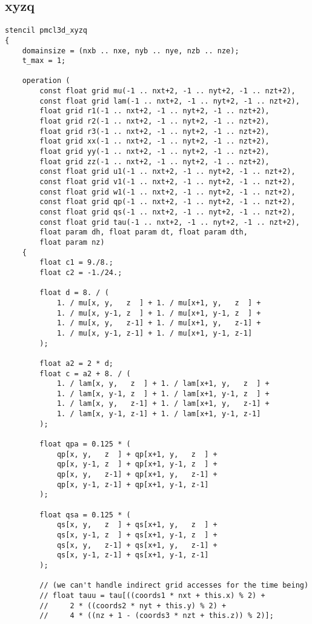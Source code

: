 \subsection{xyzq}
\begin{lstlisting}[language=stencil]
stencil pmcl3d_xyzq
{
	domainsize = (nxb .. nxe, nyb .. nye, nzb .. nze);
	t_max = 1;
	
	operation (
		const float grid mu(-1 .. nxt+2, -1 .. nyt+2, -1 .. nzt+2),
		const float grid lam(-1 .. nxt+2, -1 .. nyt+2, -1 .. nzt+2),
		float grid r1(-1 .. nxt+2, -1 .. nyt+2, -1 .. nzt+2), 
		float grid r2(-1 .. nxt+2, -1 .. nyt+2, -1 .. nzt+2),
		float grid r3(-1 .. nxt+2, -1 .. nyt+2, -1 .. nzt+2),
		float grid xx(-1 .. nxt+2, -1 .. nyt+2, -1 .. nzt+2), 
		float grid yy(-1 .. nxt+2, -1 .. nyt+2, -1 .. nzt+2),
		float grid zz(-1 .. nxt+2, -1 .. nyt+2, -1 .. nzt+2),
		const float grid u1(-1 .. nxt+2, -1 .. nyt+2, -1 .. nzt+2), 
		const float grid v1(-1 .. nxt+2, -1 .. nyt+2, -1 .. nzt+2),
		const float grid w1(-1 .. nxt+2, -1 .. nyt+2, -1 .. nzt+2),
		const float grid qp(-1 .. nxt+2, -1 .. nyt+2, -1 .. nzt+2),
		const float grid qs(-1 .. nxt+2, -1 .. nyt+2, -1 .. nzt+2),
		const float grid tau(-1 .. nxt+2, -1 .. nyt+2, -1 .. nzt+2),
		float param dh, float param dt, float param dth,
		float param nz)
	{
		float c1 = 9./8.;
		float c2 = -1./24.;

		float d = 8. / (
			1. / mu[x, y,   z  ] + 1. / mu[x+1, y,   z  ] +
			1. / mu[x, y-1, z  ] + 1. / mu[x+1, y-1, z  ] +
			1. / mu[x, y,   z-1] + 1. / mu[x+1, y,   z-1] +
			1. / mu[x, y-1, z-1] + 1. / mu[x+1, y-1, z-1]
		);      
     
     	float a2 = 2 * d;
		float c = a2 + 8. / (
			1. / lam[x, y,   z  ] + 1. / lam[x+1, y,   z  ] +
			1. / lam[x, y-1, z  ] + 1. / lam[x+1, y-1, z  ] +
			1. / lam[x, y,   z-1] + 1. / lam[x+1, y,   z-1] +
			1. / lam[x, y-1, z-1] + 1. / lam[x+1, y-1, z-1]
		);

		float qpa = 0.125 * (
			qp[x, y,   z  ] + qp[x+1, y,   z  ] +
			qp[x, y-1, z  ] + qp[x+1, y-1, z  ] +
			qp[x, y,   z-1] + qp[x+1, y,   z-1] +
			qp[x, y-1, z-1] + qp[x+1, y-1, z-1]
		);
     
		float qsa = 0.125 * (
			qs[x, y,   z  ] + qs[x+1, y,   z  ] +
			qs[x, y-1, z  ] + qs[x+1, y-1, z  ] +
			qs[x, y,   z-1] + qs[x+1, y,   z-1] +
			qs[x, y-1, z-1] + qs[x+1, y-1, z-1]
		);

		// (we can't handle indirect grid accesses for the time being)
		// float tauu = tau[((coords1 * nxt + this.x) % 2) +
		//     2 * ((coords2 * nyt + this.y) % 2) +
		//     4 * ((nz + 1 - (coords3 * nzt + this.z)) % 2)];


\end{lstlisting}
